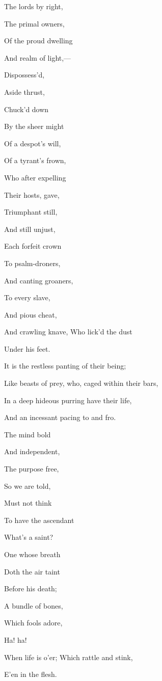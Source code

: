 The lords by right,

The primal owners,

Of the proud dwelling

And realm of light,—

Dispossess'd,

Aside thrust,

Chuck'd down

By the sheer might

Of a despot's will,

Of a tyrant's frown,

Who after expelling

Their hosts, gave,

Triumphant still,

And still unjust,

Each forfeit crown

To psalm-droners,

And canting groaners,

To every slave,

And pious cheat,

And crawling knave, Who lick'd the dust

Under his feet.


It is the restless panting of their being;

Like beasts of prey, who, caged within their bars,

In a deep hideous purring have their life,

And an incessant pacing to and fro.


The mind bold

And independent,

The purpose free,

So we are told,

Must not think

To have the ascendant

What's a saint?

One whose breath

Doth the air taint

Before his death;

A bundle of bones,

Which fools adore,

Ha! ha!

When life is o'er; Which rattle and stink,

E'en in the flesh.

